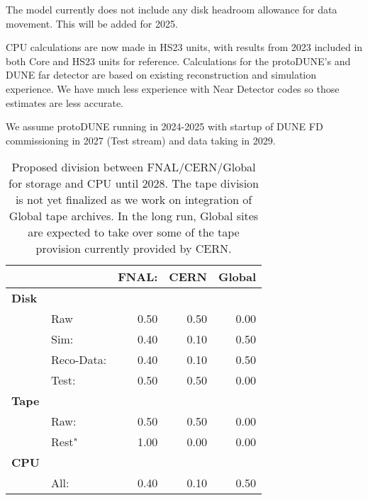 \documentclass[12pt]{article}
\begin{document}
The model currently does not include any disk headroom allowance for data movement.  This will be added for 2025. 

CPU calculations are now made in HS23 units, with results from  2023 included in both Core and HS23 units for reference.  Calculations for the protoDUNE's and DUNE far detector are based on existing reconstruction and simulation experience.  We have much less experience with Near Detector codes so those estimates are less accurate.

We assume protoDUNE running in 2024-2025 with startup of DUNE FD commissioning in 2027 (Test stream) and data taking in 2029. 



\begin{table}[h]
\begin{centering}
%

     \begin{tabular}{|ll|rrr|}
     \hline
 &&FNAL:&CERN & Global \\
 \hline
 {\bf Disk} &&&&\\
 &Raw&   0.50&   0.50&  0.00\\ 
 &Sim: & 0.40&  0.10&  0.50\\
 &Reco-Data: &  0.40&   0.10&  0.50\\ 
 &Test: &  0.50& 0.50&   0.00\\
  \hline
{\bf Tape} &&&&\\
  &Raw:&   0.50&   0.50&  0.00\\ 
  &Rest"&  1.00 & 0.00 & 0.00\\
  \hline
{\bf CPU} &&&&\\
  &All: & 0.40& 0.10&0.50\\
  \hline
   \end{tabular}
  \caption{Proposed division between FNAL/CERN/Global for storage and CPU until 2028.  The tape division is not yet finalized as we work on integration of Global tape archives. In the long run, Global sites are expected to take over some of the tape provision currently provided by CERN. }

   \label{tab:division}
   \end{centering}
   \end{table}
\end{document}
